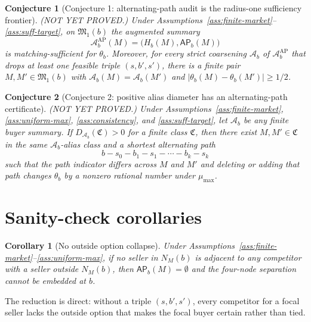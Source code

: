 \documentclass[11pt]{article}
\theoremstyle{definition}
\theoremstyle{plain}
\newtheorem{conjecture}{Conjecture}
\newtheorem{corollary}{Corollary}
\theoremstyle{remark}
\begin{document}
\begin{conjecture}[Conjecture 1: alternating-path audit is the radius-one sufficiency frontier]\label{conj:ap-radius-one}
(NOT YET PROVED.)  Under Assumptions~\ref{ass:finite-market}--\ref{ass:suff-target}, on \(\mathfrak M_1(b)\) the augmented summary
\[
\mathcal A_b^{\mathrm{AP}}(M)=\bigl(H_b(M),\mathsf{AP}_b(M)\bigr)
\]
is matching-sufficient for \(\theta_b\).  Moreover, for every strict coarsening \(\mathcal A_b\) of \(\mathcal A_b^{\mathrm{AP}}\) that drops at least one feasible triple \((s,b',s')\), there is a finite pair \(M,M'\in\mathfrak M_1(b)\) with \(\mathcal A_b(M)=\mathcal A_b(M')\) and \(|\theta_b(M)-\theta_b(M')|\ge 1/2\).
\end{conjecture}

\begin{conjecture}[Conjecture 2: positive alias diameter has an alternating-path certificate]\label{conj:certificate}
(NOT YET PROVED.)  Under Assumptions~\ref{ass:finite-market}, \ref{ass:uniform-max}, \ref{ass:consistency}, and \ref{ass:suff-target}, let \(\mathcal A_b\) be any finite buyer summary.  If \(D_{\mathcal A_b}(\mathfrak C)>0\) for a finite class \(\mathfrak C\), then there exist \(M,M'\in\mathfrak C\) in the same \(\mathcal A_b\)-alias class and a shortest alternating path
\[
b-s_0-b_1-s_1-\cdots-b_k-s_k
\]
such that the path indicator differs across \(M\) and \(M'\) and deleting or adding that path changes \(\theta_b\) by a nonzero rational number under \(\mu_{\max}\).
\end{conjecture}

\section{Sanity-check corollaries}
\begin{corollary}[No outside option collapse]\label{cor:no-outside}
Under Assumptions~\ref{ass:finite-market}--\ref{ass:uniform-max}, if no seller in \(N_M(b)\) is adjacent to any competitor with a seller outside \(N_M(b)\), then \(\mathsf{AP}_b(M)=\emptyset\) and the four-node separation cannot be embedded at \(b\).
\end{corollary}
The reduction is direct: without a triple \((s,b',s')\), every competitor for a focal seller lacks the outside option that makes the focal buyer certain rather than tied.
\end{document}
